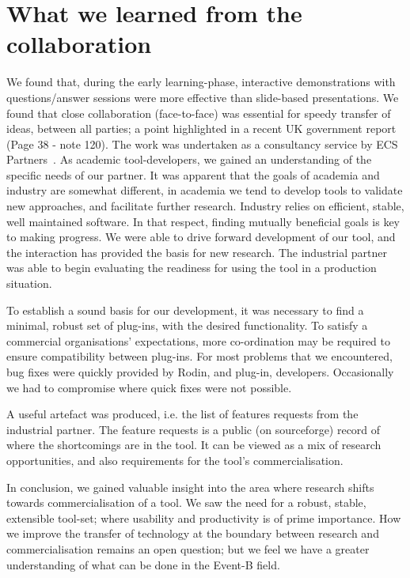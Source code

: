 \documentclass{llncs}%
\begin{document}
\section{What we learned from the collaboration}\label{Learning}
We found that, during the early learning-phase, interactive demonstrations with questions/answer sessions were more effective than slide-based presentations. We found that close collaboration (face-to-face) was essential for speedy transfer of ideas, between all parties; a point highlighted in a recent UK government report~\cite{CommonsSTC2013} (Page 38 - note 120). The work was undertaken as a consultancy service by ECS Partners~\cite{ecspartners}. As academic tool-developers, we gained an understanding of the specific needs of our partner. It was apparent that the goals of academia and industry are somewhat different, in academia we tend to develop tools to validate new approaches, and facilitate further research. Industry relies on efficient, stable, well maintained software. In that respect, finding mutually beneficial goals is key to making progress. We were able to drive forward development of our tool, and the interaction has provided the basis for new research. The industrial partner was able to begin evaluating the readiness for using the tool in a production situation.
 
To establish a sound basis for our development, it was necessary to find a minimal, robust set of plug-ins, with the desired functionality. To satisfy a commercial organisations' expectations, more co-ordination may be required to ensure compatibility between plug-ins. For most problems that we encountered, bug fixes were quickly provided by Rodin, and plug-in, developers. Occasionally we had to compromise where quick fixes were not  possible.

A useful artefact was produced, i.e. the list of features requests from the industrial partner. The feature requests is a public (on sourceforge) record of where the shortcomings are in the tool. It can be viewed as a mix of research opportunities, and also requirements for the tool's commercialisation. 

In conclusion, we gained valuable insight into the area where research shifts towards commercialisation of a tool. We saw the need for a robust, stable, extensible tool-set; where usability and productivity is of prime importance. How we improve the transfer of technology at the boundary between research and commercialisation remains an open question; but we feel we have a greater understanding of what can be done in the Event-B field.
%


%
%
%
\appendix
%
%
%
\end{document}
